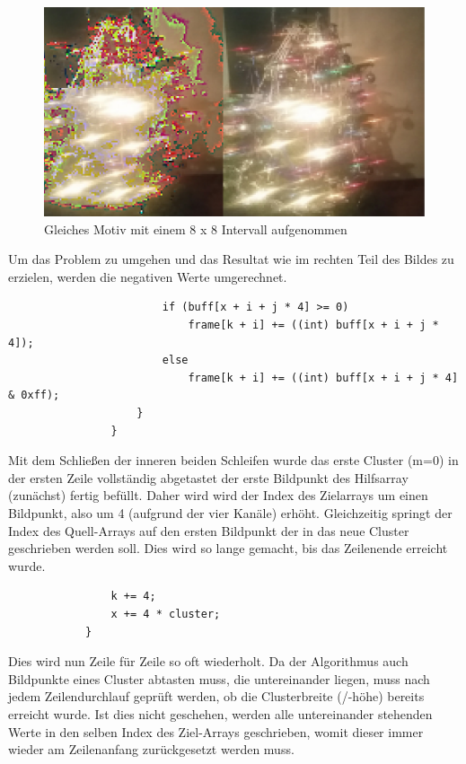 \begin{description}
\begin{figure}[h]
	\centering
		\includegraphics[width=1.0\textwidth]{img/signedUnsigned.jpg}
	\caption[signedunsigned]{Gleiches Motiv mit einem 8 x 8 Intervall aufgenommen}
	\label{fig:pig_menue}
\end{figure}
Um das Problem zu umgehen und das Resultat wie im rechten Teil des Bildes zu erzielen, werden die negativen Werte umgerechnet.
\begin{lstlisting}                    
                        if (buff[x + i + j * 4] >= 0)                                               
                            frame[k + i] += ((int) buff[x + i + j * 4]);                            
                        else
                            frame[k + i] += ((int) buff[x + i + j * 4] & 0xff);                     
                    }
                }
\end{lstlisting}
Mit dem Schließen der inneren beiden Schleifen wurde das erste Cluster (m=0) in der ersten Zeile vollständig abgetastet der erste Bildpunkt des Hilfsarray (zunächst) fertig befüllt. Daher wird wird der Index des Zielarrays um einen Bildpunkt, also um 4 (aufgrund der vier Kanäle) erhöht. Gleichzeitig springt der Index des Quell-Arrays auf den ersten Bildpunkt der in das neue Cluster geschrieben werden soll. Dies wird so lange gemacht, bis das Zeilenende erreicht wurde.
\begin{lstlisting}                 
                k += 4;                                                                             
                x += 4 * cluster;                                                                   
            }
\end{lstlisting}
Dies wird nun Zeile für Zeile so oft wiederholt. Da der Algorithmus auch Bildpunkte eines Cluster abtasten muss, die untereinander liegen, muss nach jedem Zeilendurchlauf geprüft werden, ob die Clusterbreite (/-höhe) bereits erreicht wurde. Ist dies nicht geschehen, werden alle untereinander stehenden Werte in den selben Index des Ziel-Arrays geschrieben, womit dieser immer wieder am Zeilenanfang zurückgesetzt werden muss.

\end{description}
